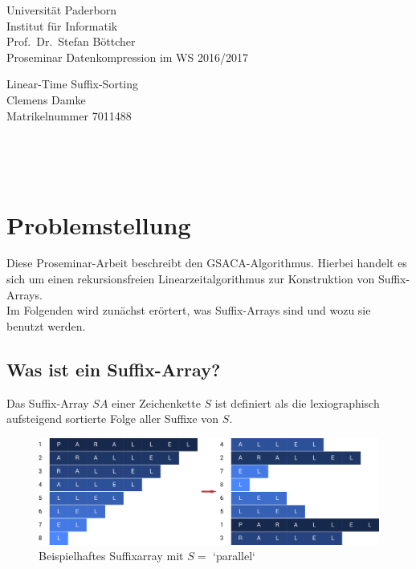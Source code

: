 \documentclass[twoside,11pt]{article}
\theoremstyle{break}
\begin{document}
\pagestyle{empty}

\begin{center}
	\sffamily
    Universität Paderborn \\
    Institut für Informatik \\
    Prof.\ Dr.\ Stefan Böttcher\\[2ex]
    Proseminar Datenkompression im WS 2016/2017

	\vspace*{\fill}
	\Huge \textcolor{blau}{Linear-Time Suffix-Sorting} \\[2ex]
    \LARGE Clemens Damke \\[1ex]
    \Large Matrikelnummer 7011488
	\vspace*{\fill}
\end{center}

\newpage
\
\newpage

\pagestyle{fancy}
\tableofcontents

\newpage
\pagestyle{empty}
\
\newpage
\pagestyle{fancy}

\section{Problemstellung}
\label{sec:Problemstellung}

Diese Proseminar-Arbeit beschreibt den GSACA-Algorithmus. Hierbei handelt es sich um einen rekursionsfreien Linearzeitalgorithmus zur Konstruktion von Suffix-Arrays.
\\

Im Folgenden wird zunächst erörtert, was Suffix-Arrays sind und wozu sie benutzt werden.

\subsection{Was ist ein Suffix-Array?}

Das Suffix-Array $SA$ einer Zeichenkette $S$ ist definiert als die lexiographisch aufsteigend sortierte Folge aller Suffixe von $S$.

\begin{figure}[h]
	\centering
	\includegraphics[width=\linewidth,bb=0 0 1474 462]{./assets/whatIsASuffixArray.pdf}
	\caption{Beispielhaftes Suffixarray mit $S =$ `parallel`}
\label{fig:whatIsASuffixArray}
\end{figure}
\end{document}
